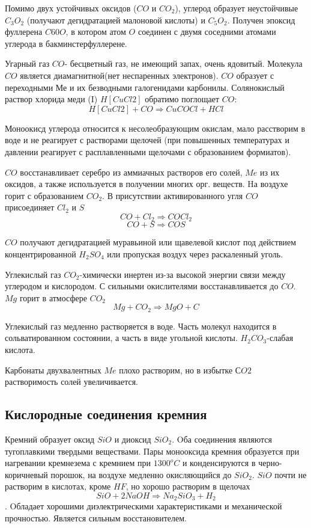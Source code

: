 \documentclass[11pt]{article}
\begin{document}
Помимо двух устойчивых оксидов ($CO$ и $CO_2$), углерод образует неустойчивые $C_3O_2$
(получают дегидратацией малоновой кислоты) и $C_5O_2$. Получен эпоксид фуллерена $C60O$,
в котором атом $O$ соединен с двумя соседними атомами углерода в бакминстерфуллерене.

Угарный газ $CO$- бесцветный газ, не имеющий запах, очень ядовитый. Молекула $CO$
является диамагнитной(нет неспаренных электронов). $CO$ образует с переходными Ме и их
безводными галогенидами карбонилы. Солянокислый раствор хлорида меди (I) $H[CuCl2]$
обратимо поглощает $CO$: 
$$H[CuCl2]+CO \Rightarrow CuCOCl+HCl$$

Моноокисд углерода относится к
несолеобразующим окислам, мало расстворим в воде и не реагирует с растворами
щелочей (при повышенных температурах и давлении реагирует с расплавленными
щелочами с образованием формиатов). 

$CO$ восстанавливает серебро из аммиачных
растворов его солей, $Me$ из их оксидов, а также используется в получении многих орг.
веществ. Hа воздухе горит с образованием $CO_2$. В присутствии активированного угля $CO$
присоединяет $Cl_2$ и  $S$ $$CO+Cl_2 \Rightarrow COCl_2$$
$$CO + S \Rightarrow COS$$

$CO$ получают дегидратацией муравьиной или
щавелевой кислот под действием концентрированной $H_2SO_4$ или пропуская воздух через
раскаленный уголь.

Углекислый газ $CO_2$-химически инертен из-за высокой энергии связи между
углеродом и кислородом. С сильными окислителями восстанавливается до $CO$. $Mg$ горит в
атмосфере $CO_2$ 
$$Mg+CO_2 \Rightarrow MgO+C$$

Углекислый газ медленно растворяется в воде. Часть молекул находится в
сольватированном состоянии, а часть в виде угольной кислоты. $H_2CO_3$-слабая кислота.

Карбонаты двухвалентных $Me$ плохо растворим, но в избытке $СO2$ растворимость солей
увеличивается.

\subsection{Кислородные соединения кремния}

Кремний образует оксид $SiO$ и диоксид $SiO_2$. Oба соединения являются
тугоплавкими твердыми веществами. Пары монооксида кремния образуется при
нагревании кремнезема с кремнием при $1300^o C$ и конденсируются в черно-коричневый
порошок, на воздухе медленно окисляющийся до $SiO_2$. $SiO$ почти не растворим в кислотах,
кроме $HF$, но хорошо растворим в щелочах $$SiO+2NaOH\Rightarrow Na_2SiO_3+H_2$$. Oбладает хорошими
диэлектрическими характеристиками и механической прочностью. Является сильным
восстановителем.
\end{document}

